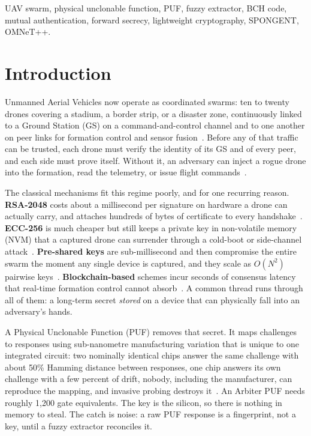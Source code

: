 \documentclass[journal]{IEEEtran}
\begin{document}
\begin{IEEEkeywords}
UAV swarm, physical unclonable function, PUF, fuzzy extractor, BCH code,
mutual authentication, forward secrecy, lightweight cryptography, SPONGENT,
OMNeT++.
\end{IEEEkeywords}

\section{Introduction}
\label{sec:intro}

Unmanned Aerial Vehicles now operate as coordinated swarms: ten to twenty
drones covering a stadium, a border strip, or a disaster zone, continuously
linked to a Ground Station (GS) on a command-and-control channel and to one
another on peer links for formation control and sensor fusion~\cite{securing_uav_fanet}.
Before any of that traffic can be trusted, each drone must verify the identity
of its GS and of every peer, and each side must prove itself. Without it, an
adversary can inject a rogue drone into the formation, read the telemetry, or
issue flight commands~\cite{puf_uav_cross_domain}.

The classical mechanisms fit this regime poorly, and for one recurring reason.
\textbf{RSA-2048} costs about a millisecond per signature on hardware a drone
can actually carry, and attaches hundreds of bytes of certificate to every
handshake~\cite{puf_lightweight_uav}. \textbf{ECC-256} is much cheaper but still
keeps a private key in non-volatile memory (NVM) that a captured drone can
surrender through a cold-boot or side-channel attack~\cite{peer2peer_auth}.
\textbf{Pre-shared keys} are sub-millisecond and then compromise the entire
swarm the moment any single device is captured, and they scale as $O(N^2)$
pairwise keys~\cite{puf_iot_strong_adversary}. \textbf{Blockchain-based}
schemes incur seconds of consensus latency that real-time formation control
cannot absorb~\cite{puf_ntu}. A common thread runs through all of them: a
long-term secret \emph{stored} on a device that can physically fall into an
adversary's hands.

A Physical Unclonable Function (PUF) removes that secret. It maps challenges to
responses using sub-nanometre manufacturing variation that is unique to one
integrated circuit: two nominally identical chips answer the same challenge
with about 50\% Hamming distance between responses, one chip answers its own
challenge with a few percent of drift, nobody, including the manufacturer, can
reproduce the mapping, and invasive probing destroys it~\cite{puf_overview}. An
Arbiter PUF needs roughly 1{,}200 gate equivalents. The key is the silicon, so
there is nothing in memory to steal. The catch is noise: a raw PUF response is
a fingerprint, not a key, until a fuzzy extractor reconciles it.
\end{document}
